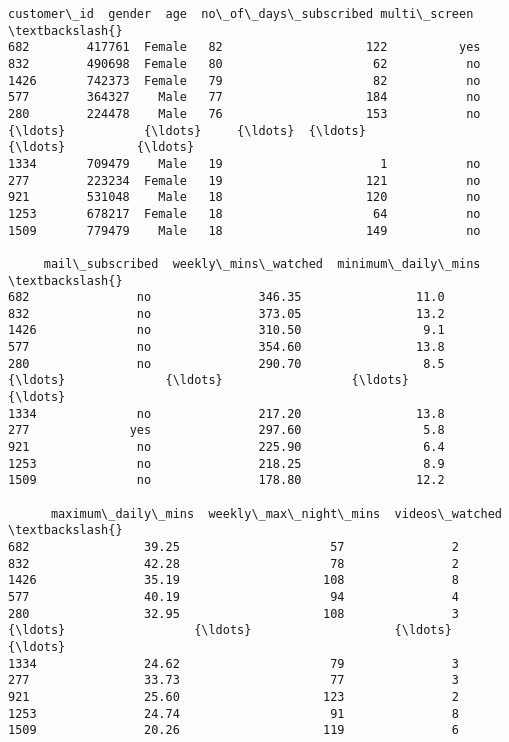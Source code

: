 \documentclass[11pt]{article}
\makeatletter
\newcommand{\boxspacing}{\kern\kvtcb@left@rule\kern\kvtcb@boxsep}
\newcommand{\prompt}[4]{
        {\ttfamily\llap{{\color{#2}[#3]:\hspace{3pt}#4}}\vspace{-\baselineskip}}
    }
\makeatother
\begin{document}
            \begin{tcolorbox}[breakable, size=fbox, boxrule=.5pt, pad at break*=1mm, opacityfill=0]
\prompt{Out}{outcolor}{51}{\boxspacing}
\begin{Verbatim}[commandchars=\\\{\}]
      customer\_id  gender  age  no\_of\_days\_subscribed multi\_screen  \textbackslash{}
682        417761  Female   82                    122          yes
832        490698  Female   80                     62           no
1426       742373  Female   79                     82           no
577        364327    Male   77                    184           no
280        224478    Male   76                    153           no
{\ldots}           {\ldots}     {\ldots}  {\ldots}                    {\ldots}          {\ldots}
1334       709479    Male   19                      1           no
277        223234  Female   19                    121           no
921        531048    Male   18                    120           no
1253       678217  Female   18                     64           no
1509       779479    Male   18                    149           no

     mail\_subscribed  weekly\_mins\_watched  minimum\_daily\_mins  \textbackslash{}
682               no               346.35                11.0
832               no               373.05                13.2
1426              no               310.50                 9.1
577               no               354.60                13.8
280               no               290.70                 8.5
{\ldots}              {\ldots}                  {\ldots}                 {\ldots}
1334              no               217.20                13.8
277              yes               297.60                 5.8
921               no               225.90                 6.4
1253              no               218.25                 8.9
1509              no               178.80                12.2

      maximum\_daily\_mins  weekly\_max\_night\_mins  videos\_watched  \textbackslash{}
682                39.25                     57               2
832                42.28                     78               2
1426               35.19                    108               8
577                40.19                     94               4
280                32.95                    108               3
{\ldots}                  {\ldots}                    {\ldots}             {\ldots}
1334               24.62                     79               3
277                33.73                     77               3
921                25.60                    123               2
1253               24.74                     91               8
1509               20.26                    119               6


\end{Verbatim}
\end{tcolorbox}
\end{document}
